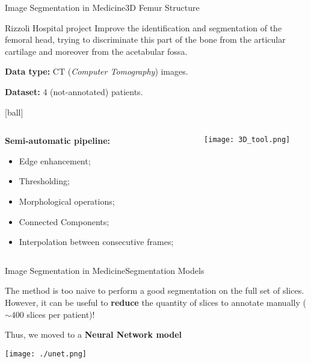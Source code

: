\documentclass{standalone}
\begin{document}
\begin{frame}{Image Segmentation in Medicine}{3D Femur Structure}


  \begin{alertblock}{Rizzoli Hospital project}
    \scriptsize{Improve the identification and segmentation of the femoral head, trying to discriminate this part of the bone from the articular cartilage and moreover from the acetabular fossa.}

    \vspace{0.5cm}
    \scriptsize{\textbf{Data type:} CT (\emph{Computer Tomography}) images.}

    \vspace{0.5cm}
    \scriptsize{\textbf{Dataset:} 4 (not-annotated) patients.}
  \end{alertblock}

  [ball]

  \begin{columns}
    \begin{column}{0.5\linewidth}
      \scriptsize{\textbf{Semi-automatic pipeline:}}

      \begin{itemize}
        \item Edge enhancement;
        \item Thresholding;
        \item Morphological operations;
        \item Connected Components;
        \item Interpolation between consecutive frames;
      \end{itemize}

    \end{column}
    \begin{column}{0.5\linewidth}
      \centering\texttt{[image: 3D\_tool.png]}
    \end{column}

  \end{columns}

\end{frame}

\begin{frame}{Image Segmentation in Medicine}{Segmentation Models}

  \scriptsize{The method is too naive to perform a good segmentation on the full set of slices.}
  \scriptsize{However, it can be useful to \textbf{reduce} the quantity of slices to annotate manually ($\sim400$ slices per patient)!}


  \centering{}

  \scriptsize{Thus, we moved to a \textbf{Neural Network model}}

  \centering\texttt{[image: ./unet.png]}

\end{frame}
\end{document}
